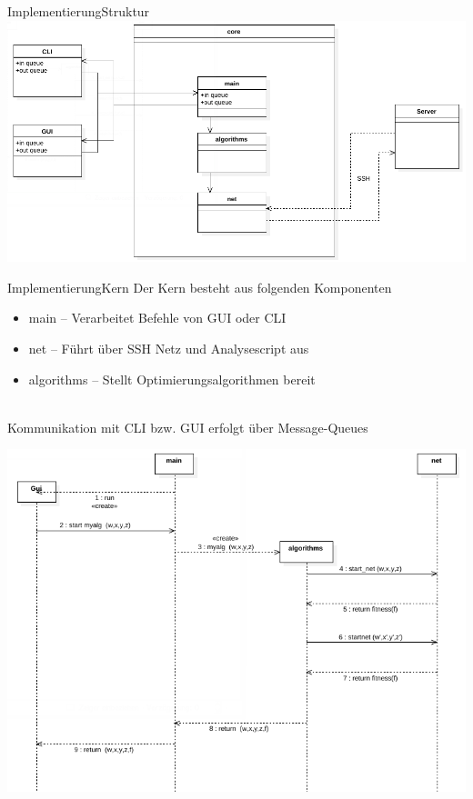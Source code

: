 \documentclass[ngerman,10pt,xcolor=colortbl,compress
]{beamer}
\begin{document}
	
	\begin{frame}{Implementierung}{Struktur}
    \includegraphics[scale=0.3]{module.png}
	\end{frame}
	\begin{frame}{Implementierung}{Kern}
	Der Kern besteht aus folgenden Komponenten
	\begin{itemize}
		\item main -- Verarbeitet Befehle von GUI oder CLI
		\item net -- Führt über SSH Netz und Analysescript aus
		\item algorithms -- Stellt Optimierungsalgorithmen bereit 
	\end{itemize}
	\mbox{}\\
	Kommunikation mit CLI bzw. GUI erfolgt über Message-Queues
	\end{frame}
	
	\begin{frame}
	\includegraphics[scale=0.4]{sequenz.png}
	\end{frame}
	
\end{document}

